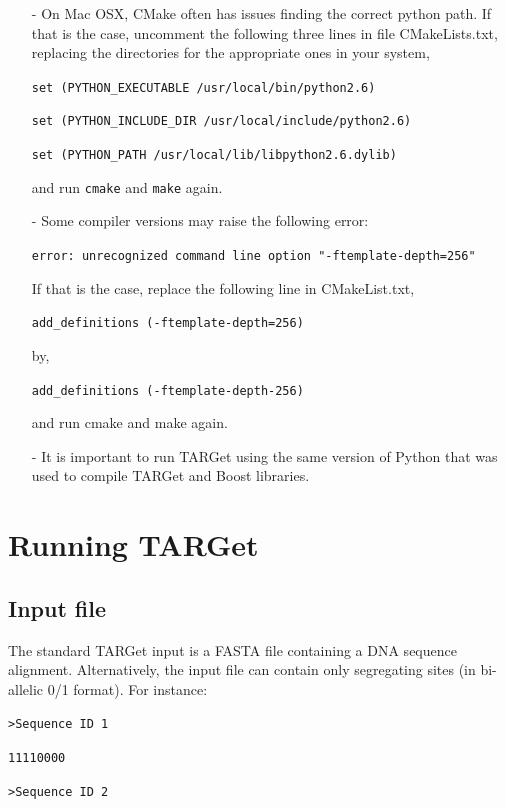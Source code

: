 \documentclass[12pt]{article}
\begin{document}
\begin{itemize}
\item[-] On Mac OSX, CMake often has issues finding the correct python path. 
If that is the case, uncomment the following three lines in file 
CMakeLists.txt, replacing the directories for the appropriate ones 
in your system,

\texttt{set (PYTHON\_EXECUTABLE /usr/local/bin/python2.6)}

\texttt{set (PYTHON\_INCLUDE\_DIR /usr/local/include/python2.6)}

\texttt{set (PYTHON\_PATH /usr/local/lib/libpython2.6.dylib)}

and run \texttt{cmake} and \texttt{make} again.

\item[-] Some compiler versions may raise the following error:

\texttt{error: unrecognized command line option "-ftemplate-depth=256"}

If that is the case, replace the following line in CMakeList.txt,

\texttt{add\_definitions  \qquad \qquad              (-ftemplate-depth=256)}

by,

\texttt{add\_definitions   \qquad \qquad          (-ftemplate-depth-256)}

and run cmake and make again.

\item[-] It is important to run TARGet using the same version of Python that 
was used to compile TARGet and Boost libraries.

\end{itemize}

\section{Running TARGet}

\subsection*{Input file}

The standard TARGet input is a FASTA file containing a DNA sequence alignment. Alternatively, the input file can contain only segregating sites (in bi-allelic 0/1 format). For instance:

\texttt{>Sequence ID 1}

\texttt{11110000}

\texttt{>Sequence ID 2}
\end{document}
